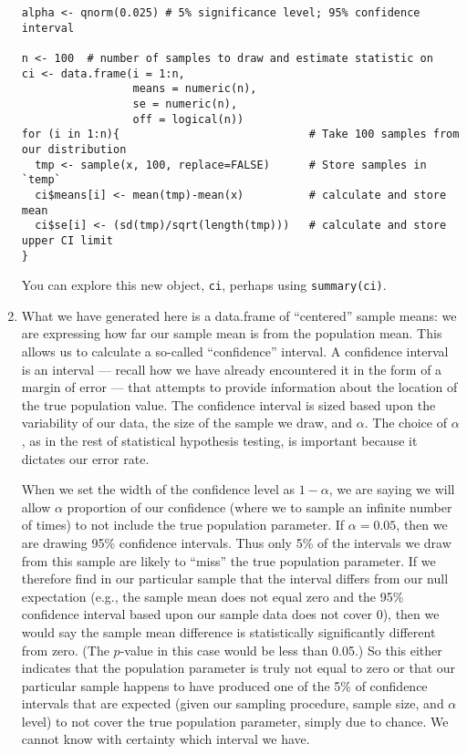 \documentclass[a4paper,12pt]{article}
\begin{document}
\begin{enumerate}
\begin{verbatim}
alpha <- qnorm(0.025) # 5% significance level; 95% confidence interval

n <- 100  # number of samples to draw and estimate statistic on
ci <- data.frame(i = 1:n,
                 means = numeric(n),
                 se = numeric(n),
                 off = logical(n))
for (i in 1:n){                             # Take 100 samples from our distribution
  tmp <- sample(x, 100, replace=FALSE)      # Store samples in `temp`
  ci$means[i] <- mean(tmp)-mean(x)          # calculate and store mean
  ci$se[i] <- (sd(tmp)/sqrt(length(tmp)))   # calculate and store upper CI limit
}
\end{verbatim}

\noindent You can explore this new object, \texttt{ci}, perhaps using \texttt{summary(ci)}.

\item What we have generated here is a data.frame of ``centered'' sample means: we are expressing how far our sample mean is from the population mean. This allows us to calculate a so-called ``confidence'' interval. A confidence interval is an interval --- recall how we have already encountered it in the form of a margin of error --- that attempts to provide information about the location of the true population value. The confidence interval is sized based upon the variability of our data, the size of the sample we draw, and $\alpha$. The choice of $\alpha$, as in the rest of statistical hypothesis testing, is important because it dictates our error rate. 

When we set the width of the confidence level as $1-\alpha$, we are saying we will allow $\alpha$ proportion of our confidence (where we to sample an infinite number of times) to not include the true population parameter. If $\alpha = 0.05$, then we are drawing 95\% confidence intervals. Thus only 5\% of the intervals we draw from this sample are likely to ``miss'' the true population parameter. If we therefore find in our particular sample that the interval differs from our null expectation (e.g., the sample mean does not equal zero and the 95\% confidence interval based upon our sample data does not cover 0), then we would say the sample mean difference is statistically significantly different from zero. (The $p$-value in this case would be less than 0.05.) So this either indicates that the population parameter is truly not equal to zero or that our particular sample happens to have produced one of the 5\% of confidence intervals that are expected (given our sampling procedure, sample size, and $\alpha$ level) to not cover the true population parameter, simply due to chance. We cannot know with certainty which interval we have.


\end{enumerate}
\end{document}
